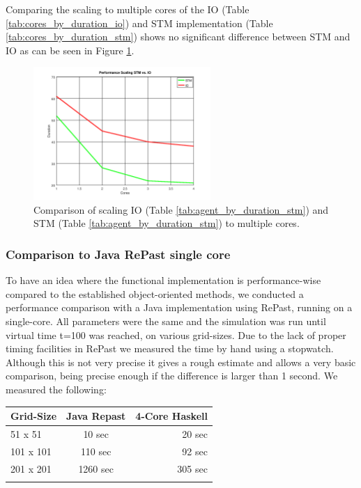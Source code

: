 Comparing the scaling to multiple cores of the IO (Table \ref{tab:cores_by_duration_io}) and STM implementation (Table \ref{tab:cores_by_duration_stm}) shows no significant difference between STM and IO as can be seen in Figure \ref{fig:core_duration_stm_io}.

\begin{figure}
	\centering
	\includegraphics[width=0.6\textwidth, angle=0]{./fig/core_duration_stm_io.png}
	\caption{Comparison of scaling IO (Table \ref{tab:agent_by_duration_stm}) and STM  (Table \ref{tab:agent_by_duration_stm}) to multiple cores.}
	\label{fig:core_duration_stm_io}
\end{figure}

\subsubsection{Comparison to Java RePast single core}
To have an idea where the functional implementation is performance-wise compared to the established object-oriented methods, we conducted a performance comparison with a Java implementation using RePast, running on a single-core. All parameters were the same and the simulation was run until virtual time t=100 was reached, on various grid-sizes. Due to the lack of proper timing facilities in RePast we measured the time by hand using a stopwatch. Although this is not very precise it gives a rough estimate and allows a very basic comparison, being precise enough if the difference is larger than 1 second. We measured the following:

\begin{center}
  \begin{tabular}{ l || c | r }
    Grid-Size & Java Repast & 4-Core Haskell \\ \hline \hline 
    51 x 51 & 10 sec & 20 sec \\ \hline
    101 x 101 & 110 sec & 92 sec \\ \hline
    201 x 201 & 1260 sec & 305 sec \\ \hline
    
    \label{tab:agent_by_duration_repast}
  \end{tabular}
\end{center}

